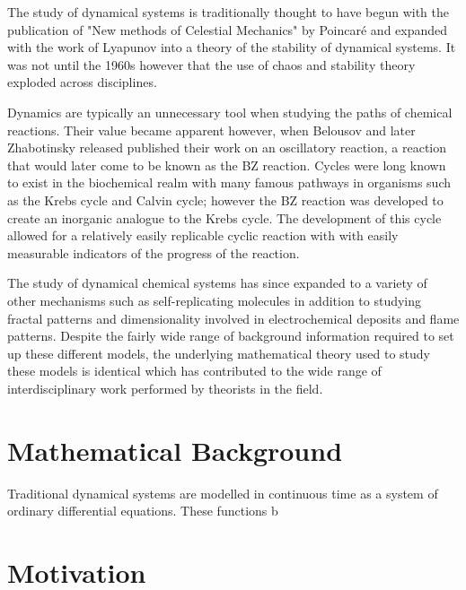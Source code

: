 The study of dynamical systems is traditionally thought to have begun with the publication of "New methods of Celestial Mechanics" by Poincar\'e and expanded with the work of Lyapunov into a theory of the stability of dynamical systems. It was not until the 1960s however that the use of chaos and stability theory exploded across disciplines\autocite{Aubin2002}. 

Dynamics are typically an unnecessary tool when studying the paths of chemical reactions. Their value became apparent however, when Belousov and later Zhabotinsky released published their work on an oscillatory reaction, a reaction that would later come to be known as the BZ reaction\autocite{Winfree1984}. Cycles were long known to exist in the biochemical realm with many famous pathways in organisms such as the Krebs cycle and Calvin cycle; however the BZ reaction was developed to create an inorganic analogue to the Krebs cycle. The development of this cycle allowed for a relatively easily replicable cyclic reaction with with easily measurable indicators of the progress of the reaction. 

The study of dynamical chemical systems has since expanded to a variety of other mechanisms such as self-replicating molecules in addition to studying fractal patterns and dimensionality involved in electrochemical deposits and flame patterns. Despite the fairly wide range of background information required to set up these different models, the underlying mathematical theory used to study these models is identical which has contributed to the wide range of interdisciplinary work performed by theorists in the field.
\section{Mathematical Background}
Traditional dynamical systems are modelled in continuous time as a system of ordinary differential equations. These functions  b 
\section{Motivation}
\lipsum[1-5]
